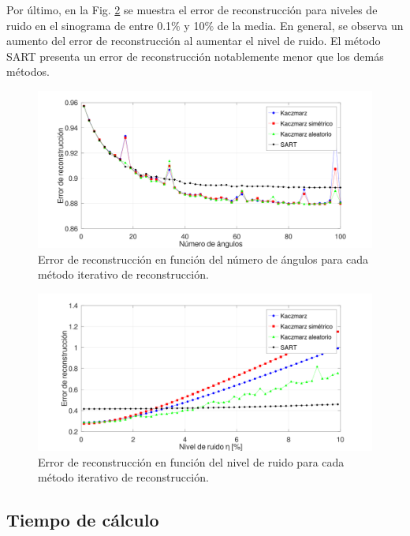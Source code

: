 \documentclass[letterpaper,12pt]{article}
\theoremstyle{plain}
\begin{document}
Por último, en la Fig. \ref{fig:error_vs_noise} se muestra el error de reconstrucción para niveles de ruido en el sinograma de entre 0.1$\%$ y 10$\%$ de la media. En general, se observa un aumento del error de reconstrucción al aumentar el nivel de ruido. El método SART presenta un error de reconstrucción notablemente menor que los demás métodos.  


\begin{figure}[H]
   \centering
         \includegraphics[width=\textwidth]{Figuras/err_vs_ang.png}
   \caption{Error de reconstrucción en función del número de ángulos para cada método iterativo de reconstrucción.}
   \label{fig:error_vs_ang}
\end{figure}


\begin{figure}[H]
   \centering
         \includegraphics[width=1\textwidth]{Figuras/err_vs_noise.png}
   \caption{Error de reconstrucción en función del nivel de ruido para cada método iterativo de reconstrucción.}
   \label{fig:error_vs_noise}
\end{figure}

\newpage

\subsection{Tiempo de cálculo}
\end{document}
